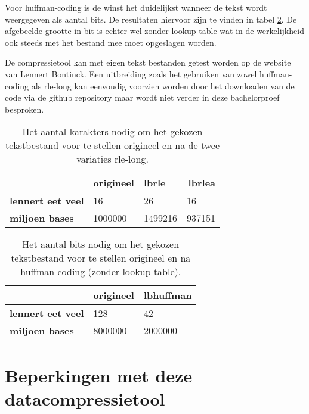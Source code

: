 Voor \gls{huffman-coding} is de winst het duidelijkst wanneer de tekst wordt weergegeven als aantal \glspl{bit}. De resultaten hiervoor zijn te vinden in tabel \ref{tab:compressietool-winst-huffman}. De afgebeelde grootte in \gls{bit} is echter wel zonder \gls{lookup-table} wat in de werkelijkheid ook steeds met het bestand mee moet opgeslagen worden.

De \gls{compressietool} kan met eigen tekst bestanden getest worden op de website van Lennert Bontinck. Een uitbreiding zoals het gebruiken van zowel \gls{huffman-coding} als \gls{rle-long} kan eenvoudig voorzien worden door het downloaden van de code via de \gls{github} repository maar wordt niet verder in deze bachelorproef besproken.

\begin{table}[h]
	\begin{tabular}{|l|l|l|l|}
		\hline
		& \textbf{origineel} & \textbf{lbrle} & \multicolumn{1}{r|}{\textbf{lbrlea}} \\ \hline
		\textbf{lennert eet veel} & 16                 & 26             & 16                                   \\ \hline
		\textbf{miljoen bases}    & 1000000            & 1499216        & 937151                               \\ \hline
	\end{tabular}
	\caption{Het aantal karakters nodig om het gekozen tekstbestand voor te stellen origineel en na de twee variaties \gls{rle-long}.}
	\label{tab:compressietool-winst-rle}
\end{table}

\begin{table}[h]
	\begin{tabular}{|l|l|l|}
		\hline
		& \textbf{origineel} & \textbf{lbhuffman} \\ \hline
		\textbf{lennert eet veel} & 128                & 42                 \\ \hline
		\textbf{miljoen bases}    & 8000000            & 2000000            \\ \hline
	\end{tabular}
	\caption{Het aantal \glspl{bit} nodig om het gekozen tekstbestand voor te stellen origineel en na \gls{huffman-coding} (zonder \gls{lookup-table}).}
	\label{tab:compressietool-winst-huffman}
\end{table}

\section{Beperkingen met deze datacompressietool}
\label{sec:compressietool-beperkingen}

